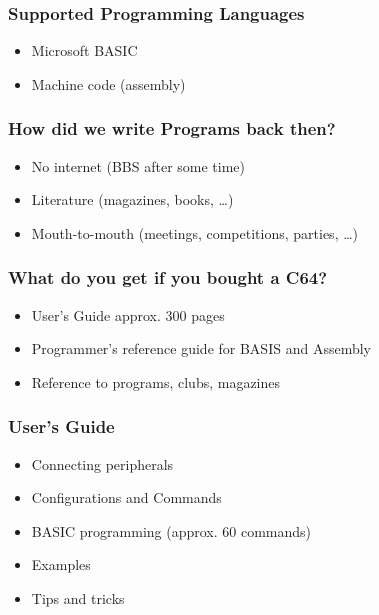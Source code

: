 \documentclass[aspectratio=43]{uva-inf-presentation}
\begin{document}

\begin{frame}
\frametitle{Supported Programming Languages}

\begin{itemize}
\item Microsoft BASIC
\item Machine code (assembly)
\end{itemize}

\end{frame}


\begin{frame}
\frametitle{How did we write Programs back then?}

\begin{itemize}
\item No internet (BBS after some time)
\item Literature (magazines, books, \dots)
\item Mouth-to-mouth (meetings, competitions, parties, \dots)
\end{itemize}

\end{frame}


\begin{frame}
\frametitle{What do you get if you bought a C64?}

\begin{itemize}
\item User's Guide approx. 300 pages
\item Programmer's reference guide for BASIS and Assembly
\item Reference to programs, clubs, magazines
\end{itemize}

\end{frame}


\begin{frame}
\frametitle{User's Guide}

\begin{itemize}
\item Connecting peripherals
\item Configurations and Commands
\item BASIC programming (approx. 60 commands)
\item Examples
\item Tips and tricks
\end{itemize}

\end{frame}
\end{document}
